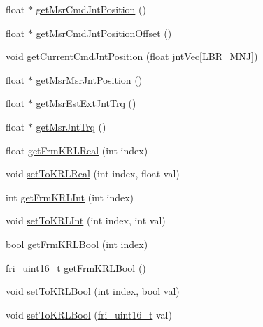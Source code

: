 {\bf }\par
\begin{DoxyCompactItemize}
\item 
float $\ast$ \hyperlink{classfriRemote_aa4fd21a8ac1576d40d2340da3b0e9396}{get\-Msr\-Cmd\-Jnt\-Position} ()
\item 
float $\ast$ \hyperlink{classfriRemote_a4bfc65235b7d68e87d8b4723eed53259}{get\-Msr\-Cmd\-Jnt\-Position\-Offset} ()
\item 
void \hyperlink{classfriRemote_a14597f1addd6d49239ed6f29d2f9c004}{get\-Current\-Cmd\-Jnt\-Position} (float jnt\-Vec\mbox{[}\hyperlink{friComm_8h_a14d10dff3deb8105d27539540b23ed6e}{\-L\-B\-R\-\_\-\-M\-N\-J}\mbox{]})
\item 
float $\ast$ \hyperlink{classfriRemote_a5fa25feb9a991db8a81d4fd68bc0d4c3}{get\-Msr\-Msr\-Jnt\-Position} ()
\item 
float $\ast$ \hyperlink{classfriRemote_a2a07951ac62f79e2e8d97addce549b00}{get\-Msr\-Est\-Ext\-Jnt\-Trq} ()
\item 
float $\ast$ \hyperlink{classfriRemote_a64e109c3d1bcc7634ca57959bb34c3ac}{get\-Msr\-Jnt\-Trq} ()
\end{DoxyCompactItemize}

{\bf }\par
\begin{DoxyCompactItemize}
\item 
float \hyperlink{classfriRemote_a520e95b367f4df3a4951fa6bfa8b6eeb}{get\-Frm\-K\-R\-L\-Real} (int index)
\item 
void \hyperlink{classfriRemote_afc92cdd57bbe7111fdb6960a4c2396fc}{set\-To\-K\-R\-L\-Real} (int index, float val)
\item 
int \hyperlink{classfriRemote_aeea8a17f656b60d8c02f953b732355f5}{get\-Frm\-K\-R\-L\-Int} (int index)
\item 
void \hyperlink{classfriRemote_a8d2f7056595b39e407517d69abf72fff}{set\-To\-K\-R\-L\-Int} (int index, int val)
\item 
bool \hyperlink{classfriRemote_a5f25b8524772c6600f1ce350d00d65e6}{get\-Frm\-K\-R\-L\-Bool} (int index)
\item 
\hyperlink{friComm_8h_a0a1dcfc27b13820295a3b5da35c526f5}{fri\-\_\-uint16\-\_\-t} \hyperlink{classfriRemote_ae53f47314effaa2d26fcabbee519ae4c}{get\-Frm\-K\-R\-L\-Bool} ()
\item 
void \hyperlink{classfriRemote_a47ebd4f0a99ce9d25c6f9d4813076993}{set\-To\-K\-R\-L\-Bool} (int index, bool val)
\item 
void \hyperlink{classfriRemote_aa6fdbff9d5d32363843902866f90c1b0}{set\-To\-K\-R\-L\-Bool} (\hyperlink{friComm_8h_a0a1dcfc27b13820295a3b5da35c526f5}{fri\-\_\-uint16\-\_\-t} val)
\end{DoxyCompactItemize}

